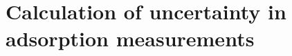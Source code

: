
\graphicspath{ {\thisappx/figures/} }

\chapter{Calculation of uncertainty in adsorption measurements}%
\label{appx:uncertainty}
